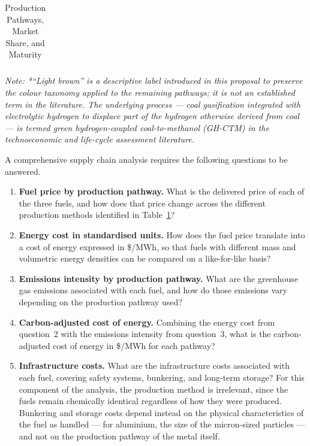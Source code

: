 \documentclass[12pt]{article}
\begin{document}
\begin{table}[h!]
\begin{tabularx}{\textwidth}{|>{\raggedright\arraybackslash}p{2.4cm}|>{\raggedright\arraybackslash}p{3.0cm}|>{\raggedright\arraybackslash}p{2.8cm}|>{\raggedright\arraybackslash}X|}
\hline
\end{tabularx}
\vspace{6pt}
\caption{Production Pathways, Market Share, and Maturity}
\label{tab:production-pathways}
\begin{minipage}{12cm}
    \vspace{0.1cm}
    \small \textit{Note: *``Light brown'' is a descriptive label introduced in this proposal to preserve the colour taxonomy applied to the remaining pathways; it is not an established term in the literature. The underlying process --- coal gasification integrated with electrolytic hydrogen to displace part of the hydrogen otherwise derived from coal --- is termed green hydrogen-coupled coal-to-methanol (GH-CTM) in the technoeconomic and life-cycle assessment literature.}
\end{minipage}
\end{table}

A comprehensive supply chain analysis requires the following questions to be answered.

\begin{enumerate}
    \item \textbf{Fuel price by production pathway.} What is the delivered price 
    of each of the three fuels, and how does that price change across the 
    different production methods identified in Table~\ref{tab:production-pathways}?

    \item \textbf{Energy cost in standardised units.} How does the fuel price 
    translate into a cost of energy expressed in \$/MWh, so that fuels with 
    different mass and volumetric energy densities can be compared on a 
    like-for-like basis?

    \item \textbf{Emissions intensity by production pathway.} What are the 
    greenhouse gas emissions associated with each fuel, and how do those 
    emissions vary depending on the production pathway used?

    \item \textbf{Carbon-adjusted cost of energy.} Combining the energy cost 
    from question~2 with the emissions intensity from question~3, what is the 
    carbon-adjusted cost of energy in \$/MWh for each pathway?

    \item \textbf{Infrastructure costs.} What are the infrastructure costs 
    associated with each fuel, covering safety systems, bunkering, and 
    long-term storage? For this component of the analysis, the production 
    method is irrelevant, since the fuels remain chemically identical 
    regardless of how they were produced. Bunkering and storage costs depend 
    instead on the physical characteristics of the fuel as handled --- for 
    aluminium, the size of the micron-sized particles --- and not on the 
    production pathway of the metal itself.
\end{enumerate}
\end{document}
